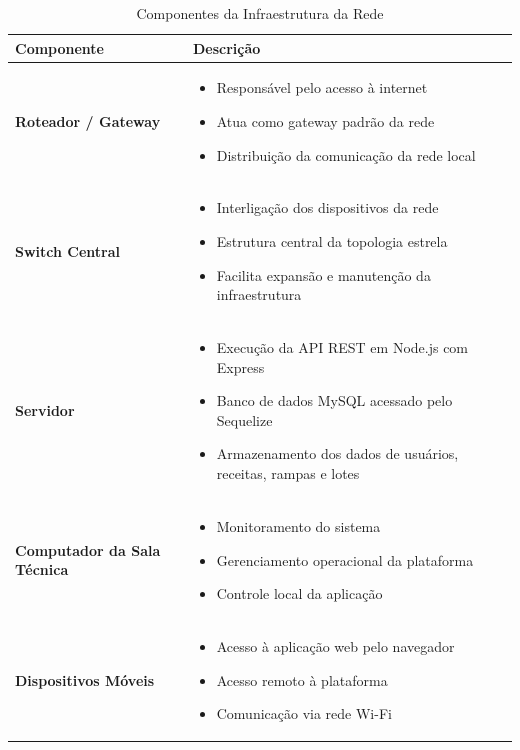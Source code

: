 \begin{table}[H]
\centering
\caption{Componentes da Infraestrutura da Rede}
\label{tab:infraestrutura}
\begin{tabular}{|l|p{10cm}|}
\hline
\textbf{Componente} & \textbf{Descrição} \\
\hline

\textbf{Roteador / Gateway} &
\begin{itemize}[leftmargin=*, nosep]
    \item Responsável pelo acesso à internet
    \item Atua como gateway padrão da rede
    \item Distribuição da comunicação da rede local
\end{itemize} \\
\hline

\textbf{Switch Central} &
\begin{itemize}[leftmargin=*, nosep]
    \item Interligação dos dispositivos da rede
    \item Estrutura central da topologia estrela
    \item Facilita expansão e manutenção da infraestrutura
\end{itemize} \\
\hline

\textbf{Servidor} &
\begin{itemize}[leftmargin=*, nosep]
    \item Execução da API REST em Node.js com Express
    \item Banco de dados MySQL acessado pelo Sequelize
    \item Armazenamento dos dados de usuários, receitas, rampas e lotes
\end{itemize} \\
\hline

\textbf{Computador da Sala Técnica} &
\begin{itemize}[leftmargin=*, nosep]
    \item Monitoramento do sistema
    \item Gerenciamento operacional da plataforma
    \item Controle local da aplicação
\end{itemize} \\
\hline

\textbf{Dispositivos Móveis} &
\begin{itemize}[leftmargin=*, nosep]
    \item Acesso à aplicação web pelo navegador
    \item Acesso remoto à plataforma
    \item Comunicação via rede Wi-Fi
\end{itemize} \\
\hline

\end{tabular}
\end{table}

